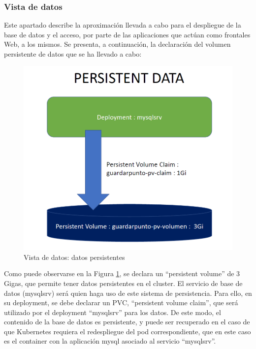 \documentclass[12pt,spanish]{article}
\begin{document}
\subsubsection{Vista de datos}
Este apartado describe la aproximación llevada a cabo para el despliegue de la base de datos y el acceso, por parte de las aplicaciones que actúan como frontales Web, a los mismos.
Se presenta, a continuación, la declaración del volumen persistente de datos que se ha llevado a cabo:
\begin{center}
 \begin{figure}[H]
 \begin{center}
   \includegraphics[width=16cm]{img/persistentData00.png}
   \caption{Vista de datos: datos persistentes}
   \label{fig:persistentData00}
 \end{center}
 \end{figure}
\end{center}
Como puede observarse en la Figura \ref{fig:persistentData00}, se declara un ``persistent volume'' de 3 Gigas, que permite tener datos persistentes en el cluster. El servicio de base de datos (mysqlsrv) será quien haga uso de este sistema de persistencia. Para ello, en su deployment, se debe declarar un PVC, ``persistent volume claim'', que será utilizado por el deployment ``mysqlsrv'' para los datos. De este modo, el contenido de la base de datos es persistente, y puede ser recuperado en el caso de que Kubernetes requiera el redespliegue del pod correspondiente, que en este caso es el container con la aplicación mysql asociado al servicio ``mysqlsrv''.
\end{document}
